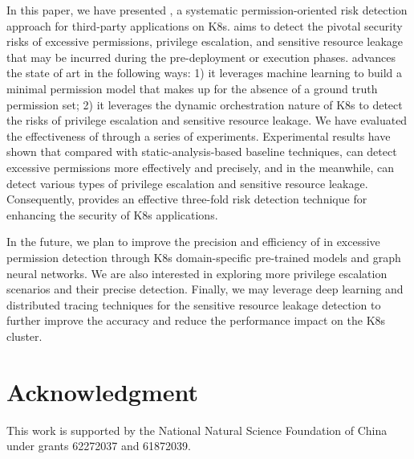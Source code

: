 \documentclass[conference]{IEEEtran}
\theoremstyle{definition}
\begin{document}
In this paper, we have presented \kg, a systematic permission-oriented risk detection approach for third-party applications on K8s. \kg aims to detect the pivotal security risks of excessive permissions, privilege escalation, and sensitive resource leakage that may be incurred during the pre-deployment or execution phases. \kg advances the state of art in the following ways: 1) it leverages machine learning to build a minimal permission model that makes up for the absence of a ground truth permission set; 2) it leverages the dynamic orchestration nature of K8s to detect the risks of privilege escalation and sensitive resource leakage. We have evaluated the effectiveness of \kg through a series of experiments. Experimental results have shown that compared with static-analysis-based baseline techniques, \kg can detect excessive permissions more effectively and precisely, and in the meanwhile, \kg can detect various types of privilege escalation and sensitive resource leakage. Consequently, \kg provides an effective three-fold risk detection technique for enhancing the security of K8s applications.

In the future, we plan to improve the precision and efficiency of \kg in excessive permission detection through K8s domain-specific pre-trained models and graph neural networks. We are also interested in exploring more privilege escalation scenarios and their precise detection. Finally, we may leverage deep learning and distributed tracing techniques for the  sensitive resource leakage detection to further improve the accuracy and reduce the performance impact on the K8s cluster. 

\section*{Acknowledgment}
This work is supported by the National Natural Science Foundation of China under grants 62272037 and 61872039.




\flushend
\end{document}
